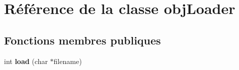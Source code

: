 \hypertarget{classobj_loader}{\section{Référence de la classe obj\-Loader}
\label{classobj_loader}
}
\subsection*{Fonctions membres publiques}
\begin{DoxyCompactItemize}
\item 
\hypertarget{classobj_loader_a3dd8724f1e8a00e1e4345087ded8a877}{int {\bfseries load} (char $\ast$filename)}\label{classobj_loader_a3dd8724f1e8a00e1e4345087ded8a877}

\end{DoxyCompactItemize}
